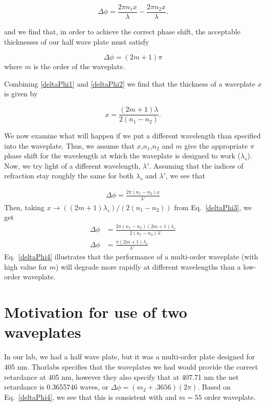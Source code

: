 \begin{equation}
\Delta \phi=\frac{2 \pi n_1 x}{\lambda} -\frac{2 \pi n_2 x}{\lambda}. \label{deltaPhi2}
\end{equation}

and we find that, in order to achieve the correct phase shift, the acceptable thicknesses of our half wave plate must satisfy

\begin{equation}
  \Delta \phi=(2m+1)\pi \label{deltaPhi1}
\end{equation}
where $m$ is the order of the waveplate.

Combining \ref{deltaPhi1} and \ref{deltaPhi2} we find that the thickness of a waveplate $x$ is given by

\begin{equation}
x=\frac{(2m+1) \lambda}{2 (n_1-n_2)}. \label{deltaPhi3}
\end{equation}


We now examine what will happen if we put a different wavelength than specified into the waveplate. Thus, we assume that $x$,$n_1$,$n_2$ and $m$ give the appropriate $\pi$ phase shift for the wavelength at which the waveplate is designed to work ($\lambda_s$). Now, we try light of a different wavelength, $\lambda'$. Assuming that the indices of refraction stay roughly the same for both $\lambda_s$ and $\lambda'$, we see that 

\begin{align}
\Delta \phi=\frac{2 \pi (n_1-n_2) x}{\lambda'} 
\end{align}
Then, taking $x\rightarrow ((2m+1) \lambda_s)/(2 (n_1-n_2))$ from Eq.\ \ref{deltaPhi3}, we get 
\begin{align}
\Delta \phi&=\frac{2 \pi (n_1-n_2) (2m+1) \lambda_s}{2 (n_1-n_2)\lambda'} \\
\Delta \phi&=\frac{\pi (2m+1) \lambda_s}{\lambda'} \label{deltaPhi4}
\end{align}
Eq.\ \ref{deltaPhi4} illustrates that the performance of a multi-order waveplate (with high value for $m$) will degrade more rapidly at different wavelengths than a low-order waveplate. 

\section{Motivation for use of two waveplates}
In our lab, we had a half wave plate, but it was a multi-order plate designed for 405 nm. Thorlabs specifies that the waveplates we had would provide the correct retardance at 405 nm, however they also specify that at 407.71 nm the net retardance is 0.3655746 waves, or $\Delta \phi=(m_2+.3656) (2 \pi)$. Based on Eq.\ \ref{deltaPhi4}, we see that this is consistent with and $m=55$ order waveplate. 

